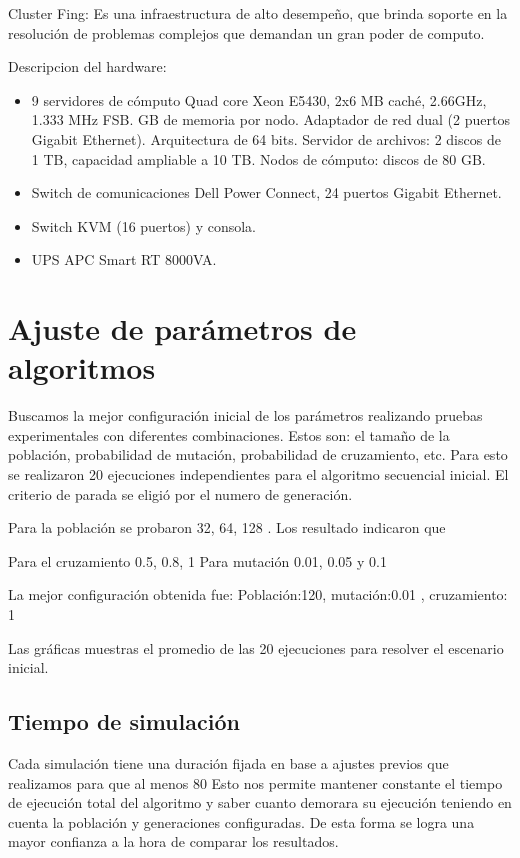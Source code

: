Cluster Fing: Es una infraestructura de alto desempeño, que brinda soporte en la resolución de problemas complejos que demandan un gran poder de computo.

Descripcion del hardware: 
\begin{itemize}
	\item 9 servidores de cómputo
	\subitem Quad core Xeon E5430, 2x6 MB caché, 2.66GHz, 1.333 MHz FSB.
	 GB de memoria por nodo.
	\subitem Adaptador de red dual (2 puertos Gigabit Ethernet).
	\subitem  Arquitectura de 64 bits.
	\subitem Servidor de archivos: 2 discos de 1 TB, capacidad ampliable a 10 TB.
	\subitem Nodos de cómputo: discos de 80 GB.
	\item Switch de comunicaciones
	\subitem Dell Power Connect, 24 puertos Gigabit Ethernet.
	\item Switch KVM (16 puertos) y consola.
	\item UPS APC Smart RT 8000VA.
\end{itemize}

\section{Ajuste de parámetros de algoritmos}
Buscamos la mejor configuración inicial de los parámetros realizando pruebas experimentales con diferentes combinaciones.  Estos son: el tamaño de la población,  probabilidad de mutación, probabilidad de cruzamiento, etc.
Para esto se realizaron 20 ejecuciones independientes para el algoritmo secuencial inicial.
El criterio de parada se eligió por el numero de generación.

Para la población se probaron 32, 64, 128 . Los resultado indicaron que 

Para el cruzamiento 0.5, 0.8, 1
Para mutación 0.01, 0.05 y 0.1

La mejor  configuración obtenida fue:
Población:120, mutación:0.01 , cruzamiento: 1

Las gráficas muestras el promedio de las 20 ejecuciones para resolver el escenario inicial.


\subsection{Tiempo de simulación}

Cada simulación tiene una duración fijada en base a ajustes previos que realizamos para que al menos 80 %
Esto nos permite mantener constante el tiempo de ejecución total del algoritmo y saber cuanto demorara su ejecución teniendo en cuenta la población y generaciones configuradas. De esta forma se logra una mayor confianza a la hora de comparar los resultados.



